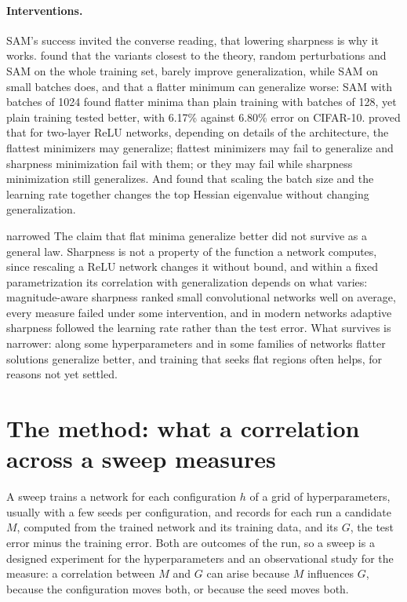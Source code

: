 \begin{refsection}
\paragraph{Interventions.} SAM's success invited the converse reading, that lowering sharpness is why it works. \Textcite{AndriushchenkoFlammarion2022} found that the variants closest to the theory, random perturbations and SAM on the whole training set, barely improve generalization, while SAM on small batches does, and that a flatter minimum can generalize worse: SAM with batches of 1024 found flatter minima than plain training with batches of 128, yet plain training tested better, with 6.17\% against 6.80\% error on CIFAR-10. \Textcite{WenLiMa2023} proved that for two-layer ReLU networks, depending on details of the architecture, the flattest minimizers may generalize; flattest minimizers may fail to generalize and sharpness minimization fail with them; or they may fail while sharpness minimization still generalizes. And \textcite{KaurCohenLipton2023} found that scaling the batch size and the learning rate together changes the top Hessian eigenvalue without changing generalization.

\begin{verdict}{narrowed}
The claim that flat minima generalize better did not survive as a general law. Sharpness is not a property of the function a network computes, since rescaling a ReLU network changes it without bound, and within a fixed parametrization its correlation with generalization depends on what varies: magnitude-aware sharpness ranked small convolutional networks well on average, every measure failed under some intervention, and in modern networks adaptive sharpness followed the learning rate rather than the test error. What survives is narrower: along some hyperparameters and in some families of networks flatter solutions generalize better, and training that seeks flat regions often helps, for reasons not yet settled.
\end{verdict}

\section{The method: what a correlation across a sweep measures}\label{sec:sharpness:sweep}

A sweep trains a network for each configuration $h$ of a grid of hyperparameters, usually with a few seeds per configuration, and records for each run a candidate  $M$, computed from the trained network and its training data, and its  $G$, the test error minus the training error. Both are outcomes of the run, so a sweep is a designed experiment for the hyperparameters and an observational study for the measure: a correlation between $M$ and $G$ can arise because $M$ influences $G$, because the configuration moves both, or because the seed moves both.


\end{refsection}
